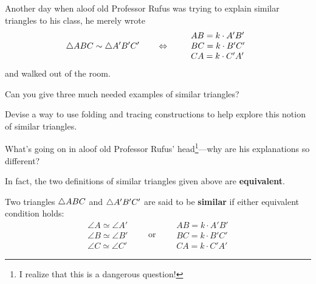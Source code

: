 \documentclass{ximera}
\begin{document}


Another day when aloof old Professor Rufus was trying to explain
similar triangles to his class, he merely wrote
\[
\triangle ABC \sim \triangle A'B'C' \qquad\Leftrightarrow \qquad
\begin{array}{l}
AB = k\cdot A'B'\\
BC = k\cdot B'C' \\
CA = k\cdot C'A'
\end{array}
\]
and walked out of the room.

\begin{question} 
Can you give three much needed examples of similar triangles? 
\end{question}


\begin{question} 
Devise a way to use folding and tracing constructions to help explore this notion
of similar triangles.
\end{question}




\begin{question} 
What's going on in aloof old Professor Rufus' head\footnote{I realize that
this is a dangerous question!}---why are his explanations so different?
\end{question}


In fact, the two definitions of similar triangles given
above are \textbf{equivalent}.


\begin{definition} 
Two triangles $\triangle ABC$ and $\triangle A'B'C'$ are said to be
\textbf{similar} if either equivalent condition holds:
\[
\begin{array}{l}
\angle A \simeq \angle A'\\
\angle B \simeq \angle B' \\
\angle C \simeq \angle C'
\end{array}
\qquad\text{or}\qquad
\begin{array}{l}
AB = k\cdot A'B'\\
BC = k\cdot B'C' \\
CA = k\cdot C'A'
\end{array}
\]
\end{definition}
\end{document}
